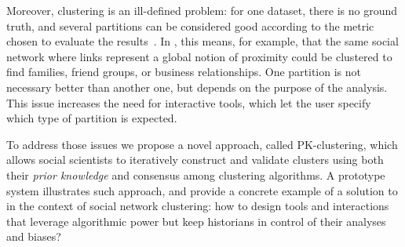 Moreover, clustering is an ill-defined problem: for one dataset, there is no ground truth, and several partitions can be considered good according to the metric chosen to evaluate the results~\cite{kleinbergImpossibilityTheoremClustering2002}.
In \sna, this means, for example, that the same social network where links represent a global notion of proximity could be clustered to find families, friend groups, or business relationships.
One partition is not necessary better than another one, but depends on the purpose of the analysis.
This issue increases the need for interactive tools, which let the user specify which type of partition is expected.

To address those issues we propose a novel approach, called PK-clustering, which allows social scientists to iteratively construct and validate clusters using both their \emph{prior knowledge} and consensus among clustering algorithms.
A prototype system illustrates such approach, and provide a concrete example of a solution to \qthree in the context of social network clustering: how to design \va tools and interactions that leverage algorithmic power but keep historians in control of their analyses and biases?



